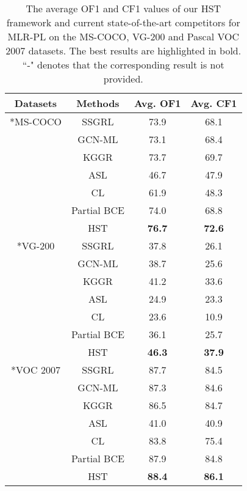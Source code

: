 \begin{table}[!t]
  \centering
  \footnotesize
  \begin{tabular}{c|c|cc}
\hline
  \centering Datasets & Methods & Avg. OF1  & Avg. CF1 \\
  \hline
  \hline
  \centering \multirow{8}*{MS-COCO} & SSGRL & 73.9 & 68.1 \\
  \centering ~ & GCN-ML & 73.1 & 68.4 \\
  \centering ~ & KGGR & 73.7 & 69.7 \\
  \centering ~ & ASL & 46.7 &  47.9 \\
  \centering ~ & CL & 61.9 & 48.3 \\
  \centering ~ & Partial BCE & 74.0 & 68.8 \\
  \centering ~ & HST & \textbf{76.7} & \textbf{72.6} \\
  \hline
  \hline
  \centering \multirow{8}*{VG-200} & SSGRL & 37.8 & 26.1 \\
  \centering ~ & GCN-ML & 38.7 & 25.6 \\
  \centering ~ & KGGR & 41.2 & 33.6 \\
  \centering ~ & ASL & 24.9 &  23.3 \\
  \centering ~ & CL & 23.6 & 10.9 \\
  \centering ~ & Partial BCE & 36.1 &  25.7 \\
  \centering ~ & HST & \textbf{46.3} & \textbf{37.9} \\
  \hline
  \hline
  \centering \multirow{8}*{VOC 2007} & SSGRL & 87.7 & 84.5 \\
  \centering ~ & GCN-ML & 87.3 & 84.6 \\
  \centering ~ & KGGR & 86.5 & 84.7 \\
  \centering ~ & ASL & 41.0 & 40.9 \\
  \centering ~ & CL & 83.8 &75.4 \\
  \centering ~ & Partial BCE & 87.9 & 84.8 \\
  \centering ~ & HST & \textbf{88.4} & \textbf{86.1} \\
  \hline
  \end{tabular}
  \vspace{2pt}
  \caption{The average OF1 and CF1 values of our HST framework and current state-of-the-art competitors for MLR-PL on the MS-COCO, VG-200 and Pascal VOC 2007 datasets. The best results are highlighted in bold. ``-" denotes that the corresponding result is not provided.}
  \label{tab:average-results}
\end{table}

